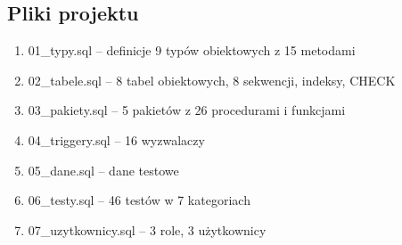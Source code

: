 \documentclass[12pt,a4paper]{article}
\begin{document}
\subsection{Pliki projektu}
\begin{enumerate}[nosep]
    \item 01\_typy.sql -- definicje 9 typów obiektowych z 15 metodami
    \item 02\_tabele.sql -- 8 tabel obiektowych, 8 sekwencji, indeksy, CHECK
    \item 03\_pakiety.sql -- 5 pakietów z 26 procedurami i funkcjami
    \item 04\_triggery.sql -- 16 wyzwalaczy
    \item 05\_dane.sql -- dane testowe
    \item 06\_testy.sql -- 46 testów w 7 kategoriach
    \item 07\_uzytkownicy.sql -- 3 role, 3 użytkownicy
\end{enumerate}
\end{document}
